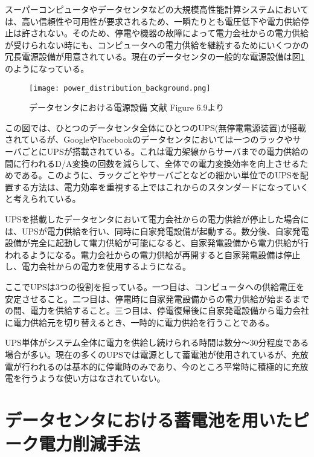 スーパーコンピュータやデータセンタなどの大規模高性能計算システムにおいては、高い信頼性や可用性が要求されるため、一瞬たりとも電圧低下や電力供給停止は許されない。そのため、停電や機器の故障によって電力会社からの電力供給が受けられない時にも、コンピュータへの電力供給を継続するためにいくつかの冗長電源設備が用意されている。現在のデータセンタの一般的な電源設備は図\ref{fig:power_distribution_background}のようになっている。
\begin{figure}[t]
 \begin{center}
  \texttt{[image: power\_distribution\_background.png]}
 \end{center}
 \caption{データセンタにおける電源設備 文献\cite{Hennessy:2011:CAF:1999263} Figure 6.9より}
 \label{fig:power_distribution_background}
\end{figure}

この図では、ひとつのデータセンタ全体にひとつのUPS(無停電電源装置)が搭載されているが、GoogleやFacebookのデータセンタにおいては一つのラックやサーバごとにUPSが搭載されている\cite{Datacenter}。これは電力架線からサーバまでの電力供給の間に行われるD/A変換の回数を減らして、全体での電力変換効率を向上させるためである。このように、ラックごとやサーバごとなどの細かい単位でのUPSを配置する方法は、電力効率を重視する上ではこれからのスタンダードになっていくと考えられている。

UPSを搭載したデータセンタにおいて電力会社からの電力供給が停止した場合には、UPSが電力供給を行い、同時に自家発電設備が起動する。数分後、自家発電設備が完全に起動して電力供給が可能になると、自家発電設備から電力供給が行われるようになる。電力会社からの電力供給が再開すると自家発電設備は停止し、電力会社からの電力を使用するようになる。

ここでUPSは3つの役割を担っている。一つ目は、コンピュータへの供給電圧を安定させること。二つ目は、停電時に自家発電設備からの電力供給が始まるまでの間、電力を供給すること。三つ目は、停電復帰後に自家発電設備から電力会社に電力供給元を切り替えるとき、一時的に電力供給を行うことである。

UPS単体がシステム全体に電力を供給し続けられる時間は数分〜30分程度である場合が多い。現在の多くのUPSでは電源として蓄電池が使用されているが、充放電が行われるのは基本的に停電時のみであり、今のところ平常時に積極的に充放電を行うような使い方はなされていない。



\section{データセンタにおける蓄電池を用いたピーク電力削減手法}
\label{sec:capping}

